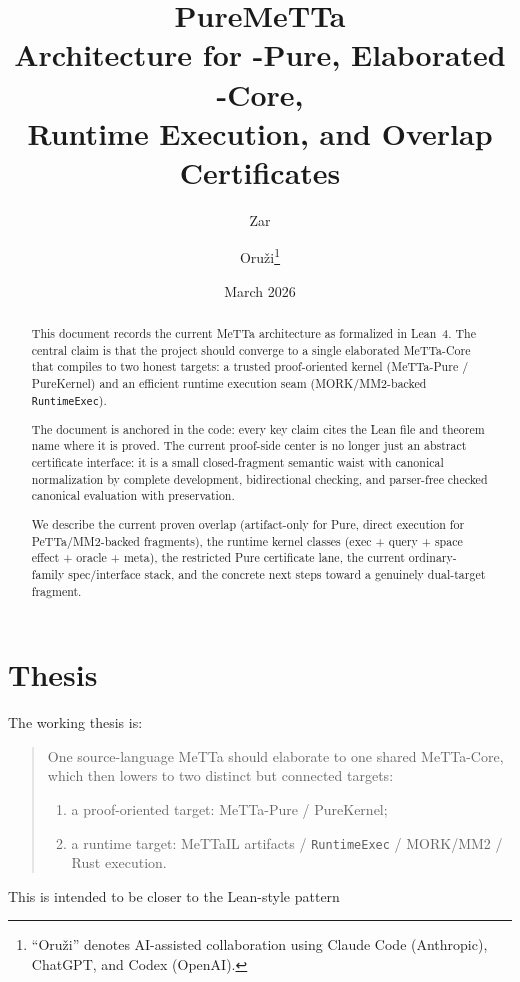 \documentclass[11pt]{article}
\title{PureMeTTa\\
\large Architecture for \MeTTa-Pure, Elaborated \MeTTa-Core,\\
Runtime Execution, and Overlap Certificates}
\author{Zar \and Oru\v{z}i\footnote{``Oru\v{z}i'' denotes AI-assisted
collaboration using Claude Code (Anthropic), ChatGPT, and Codex (OpenAI).}}
\date{March 2026}
\theoremstyle{remark}
\newcommand{\MeTTa}{\textup{MeTTa}}
\newcommand{\MeTTaIL}{\textup{MeTTaIL}}
\newcommand{\MORK}{\textup{MORK}}
\newcommand{\PeTTa}{\textup{PeTTa}}
\newcommand{\code}[1]{\texttt{#1}}
\begin{document}
\maketitle

\begin{abstract}
This document records the current \MeTTa{} architecture as formalized in Lean~4.
The central claim is that the project should converge to a single elaborated
\MeTTa-Core that compiles to two honest targets: a trusted proof-oriented kernel
(\MeTTa-Pure / PureKernel) and an efficient runtime execution seam
(\MORK{}/MM2-backed \code{RuntimeExec}).

The document is anchored in the code: every key claim cites the Lean file and
theorem name where it is proved. The current proof-side center is no longer
just an abstract certificate interface: it is a small closed-fragment semantic
waist with canonical normalization by complete development, bidirectional
checking, and parser-free checked canonical evaluation with preservation.

We describe the current proven overlap (artifact-only for Pure, direct execution
for \PeTTa{}/MM2-backed fragments), the runtime kernel classes
(exec + query + space effect + oracle + meta), the restricted Pure certificate
lane, the current ordinary-family spec/interface stack, and the concrete next
steps toward a genuinely dual-target fragment.
\end{abstract}

\tableofcontents

\section{Thesis}
\label{sec:thesis}

The working thesis is:

\begin{quote}
One source-language \MeTTa{} should elaborate to one shared \MeTTa-Core, which then
lowers to two distinct but connected targets:
\begin{enumerate}[nosep]
  \item a proof-oriented target: \MeTTa-Pure / PureKernel;
  \item a runtime target: \MeTTaIL{} artifacts / \code{RuntimeExec} /
  \MORK{}/MM2 / Rust execution.
\end{enumerate}
\end{quote}

This is intended to be closer to the Lean-style pattern
\end{document}
